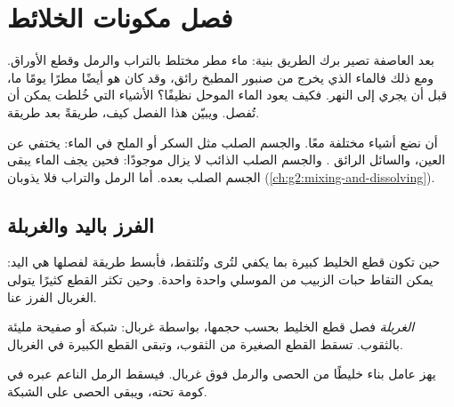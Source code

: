 \chapter{فصل مكونات الخلائط}\label{ch:g3:separating-mixtures}

بعد العاصفة تصير برك الطريق بنية: ماء مطر مختلط بالتراب والرمل وقطع
الأوراق. ومع ذلك فالماء الذي يخرج من صنبور المطبخ رائق، وقد كان هو
أيضًا مطرًا يومًا ما، قبل أن يجري إلى النهر. فكيف يعود الماء الموحل
نظيفًا؟ الأشياء التي خُلطت يمكن أن تُفصل. ويبيّن هذا الفصل كيف، طريقةً
بعد طريقة.

\begin{recall}
 أن نضع أشياء مختلفة معًا. والجسم الصلب مثل السكر أو الملح 
في الماء: يختفي عن العين، والسائل الرائق . والجسم الصلب الذائب
لا يزال موجودًا: فحين يجف الماء يبقى الجسم الصلب بعده. أما الرمل
والتراب فلا يذوبان
(\cref{ch:g2:mixing-and-dissolving}).
\end{recall}

\section{الفرز باليد والغربلة}

حين تكون قطع الخليط كبيرة بما يكفي لتُرى وتُلتقط، فأبسط طريقة لفصلها
هي اليد: يمكن التقاط حبات الزبيب من الموسلي واحدة واحدة. وحين تكثر
القطع كثيرًا يتولى الغربال الفرز عنا.

\begin{definition}[الغربلة]\label{def:g3:separating-mixtures:sieve}
\emph{الغربلة} فصل قطع الخليط بحسب حجمها، بواسطة
غربال: شبكة أو صفيحة مليئة بالثقوب. تسقط القطع الصغيرة من الثقوب،
وتبقى القطع الكبيرة في الغربال.
\end{definition}

\begin{example}\label{ex:g3:separating-mixtures:gravel}
يهز عامل بناء خليطًا من الحصى والرمل فوق غربال. فيسقط الرمل الناعم
عبره في كومة تحته، ويبقى الحصى على الشبكة.
\end{example}

